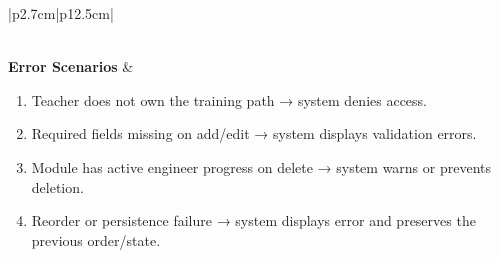 \begin{table}[H]
\begin{tabular}{|p{2.7cm}|p{12.5cm}|}
\begin{minipage}[t]{\linewidth}
        \end{minipage} \\
        \hline
        \textbf{Error Scenarios} &
        \begin{minipage}[t]{\linewidth}
            \begin{enumerate}[topsep=0pt,itemsep=1pt,parsep=0pt,partopsep=0pt]
                \item Teacher does not own the training path → system denies access.
                \item Required fields missing on add/edit → system displays validation errors.
                \item Module has active engineer progress on delete → system warns or prevents deletion.
                \item Reorder or persistence failure → system displays error and preserves the previous order/state.
            \end{enumerate}
        \end{minipage} \\
        \hline
    \end{tabular}
    \label{tab:teacher-manage-modules}
\end{table}
 
